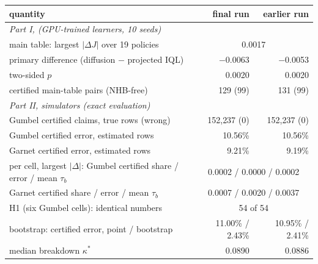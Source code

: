 \begin{tabular}{lrr}
\toprule
quantity & final run & earlier run \\
\midrule
\multicolumn{3}{l}{\emph{Part I, \icu{} (GPU-trained learners, 10 seeds)}} \\
main table: largest $|\Delta J|$ over 19 policies & \multicolumn{2}{c}{0.0017} \\
primary difference (diffusion $-$ projected IQL) & $-$0.0063 & $-$0.0053 \\
\quad two-sided $p$ & 0.0020 & 0.0020 \\
certified main-table pairs (NHB-free) & 129 (99) & 131 (99) \\
\multicolumn{3}{l}{\emph{Part II, simulators (exact evaluation)}} \\
Gumbel certified claims, true rows (wrong) & 152{,}237 (0) & 152{,}237 (0) \\
Gumbel certified error, estimated rows & 10.56\% & 10.56\% \\
Garnet certified error, estimated rows & 9.21\% & 9.19\% \\
per cell, largest $|\Delta|$: Gumbel certified share / error / mean $\tau_b$ & \multicolumn{2}{c}{0.0002 / 0.0000 / 0.0002} \\
\quad Garnet certified share / error / mean $\tau_b$ & \multicolumn{2}{c}{0.0007 / 0.0020 / 0.0037} \\
H1 (six Gumbel cells): identical numbers & \multicolumn{2}{c}{54 of 54} \\
bootstrap: certified error, point / bootstrap & 11.00\% / 2.43\% & 10.95\% / 2.41\% \\
\icu{} median breakdown $\kappa^*$ & 0.0890 & 0.0886 \\
\bottomrule
\end{tabular}
